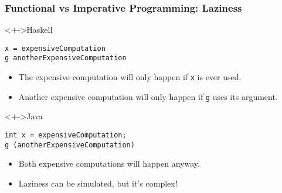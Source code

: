 \documentclass{beamer}
\begin{document}
\begin{frame}[fragile]
  \frametitle{Functional vs Imperative Programming: Laziness}
  \begin{block}<+->{Haskell}
\begin{verbatim}
x = expensiveComputation
g anotherExpensiveComputation
\end{verbatim}
    \begin{itemize}
    \item The expensive computation will only happen if \texttt{x} is
      ever used.
    \item Another expensive computation will only happen if \texttt{g}
      uses its argument.
    \end{itemize}
  \end{block}
  \begin{block}<+->{Java}
\begin{verbatim}
int x = expensiveComputation;
g (anotherExpensiveComputation)
\end{verbatim}
    \begin{itemize}
    \item Both expensive computations will happen anyway.
    \item Laziness can be simulated, but it's complex!
  \end{itemize}
  \end{block}
\end{frame}
\end{document}
